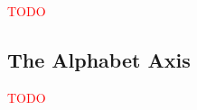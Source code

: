 \textcolor{red}{TODO}

\subsection{The Alphabet Axis}
\label{sec:deepdfa-alphabet}

\textcolor{red}{TODO}

